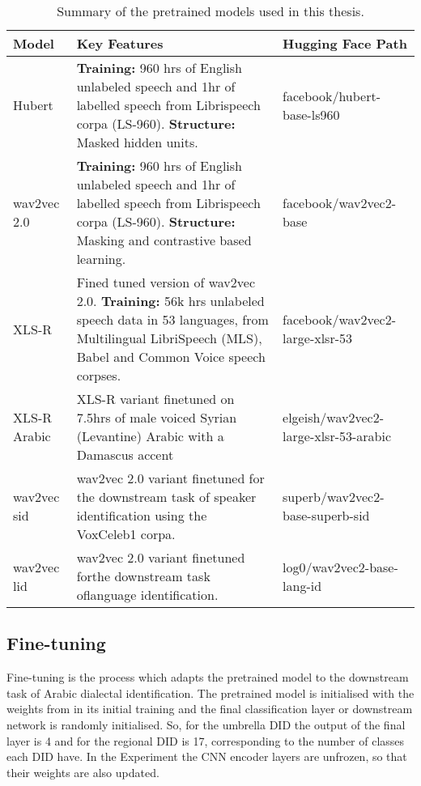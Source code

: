 \begin{table}[hb!]
    \label{tab:PretrainedModels}
    \begin{center}
    \begin{tabular}{|m{3cm} || m{7cm} | m{6.5cm} |}
        \hline
        \textbf{Model} & \textbf{Key Features} & \textbf{Hugging Face Path}\\
        \hline
        Hubert & 
        \textbf{Training:} 960 hrs of English unlabeled speech and 1hr of labelled speech from  Librispeech corpa (LS-960).\newline 
        \textbf{Structure:} Masked hidden units.
        & facebook/hubert-base-ls960\\
        \hline
        wav2vec 2.0 & 
        \textbf{Training:} 960 hrs of English unlabeled speech and 1hr of labelled speech from Librispeech corpa (LS-960). \newline
        \textbf{Structure:} Masking and contrastive based learning.
        &facebook/wav2vec2-base\\
        \hline
        XLS-R &
        Fined tuned version of wav2vec 2.0.\newline
        \textbf{Training:} 56k hrs unlabeled speech data \newline in 53 languages, from Multilingual \newline LibriSpeech (MLS), 
        Babel and Common Voice speech corpses. 
         &facebook/wav2vec2-large-xlsr-53\\
        \hline
        XLS-R Arabic & XLS-R variant finetuned on 7.5hrs of male voiced Syrian (Levantine) Arabic with a Damascus accent &
        elgeish/wav2vec2-large-xlsr-53-arabic \\
        \hline
        wav2vec sid & wav2vec 2.0 variant finetuned for the downstream task of speaker identification using the VoxCeleb1 corpa. 
         &superb/wav2vec2-base-superb-sid\\
        \hline
        wav2vec lid & wav2vec 2.0 variant finetuned for\newline the downstream task of\newline language identification.
        &log0/wav2vec2-base-lang-id\\
        \hline
    \end{tabular}
    \caption{Summary of the pretrained models used in this thesis.}
    \end{center}
\end{table}

\subsection{Fine-tuning}
Fine-tuning is the process which adapts the pretrained model to the downstream task of Arabic dialectal identification. 
The pretrained model is initialised with the weights from in its initial training and the final classification layer or downstream network is randomly initialised. 
So, for the umbrella DID the output of the final layer is 4 and for the regional DID is 17, corresponding to the number of classes each DID have. In the Experiment {} 
the CNN encoder layers are unfrozen, so that their weights are also updated. 

